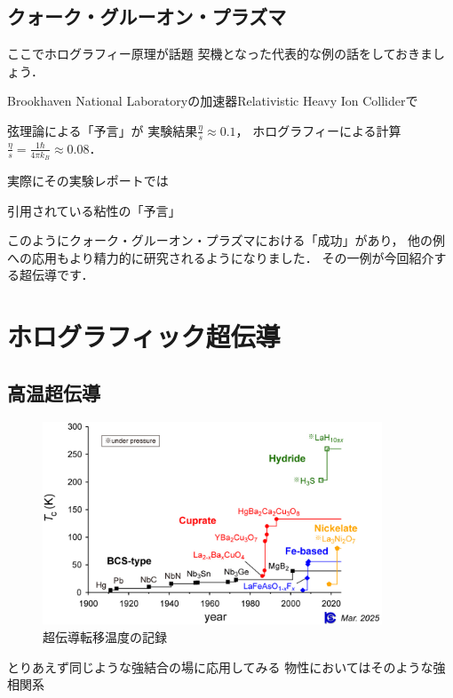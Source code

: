\documentclass[b5paper,11pt,dvipdfmx]{jsarticle}
\numberwithin{equation}{section}
\theoremstyle{definition}
\begin{document}
\subsection{クォーク・グルーオン・プラズマ}
ここでホログラフィー原理が話題
契機となった代表的な例の話をしておきましょう．

Brookhaven National Laboratoryの加速器Relativistic Heavy Ion Colliderで


弦理論による「予言」が
実験結果$\frac{\eta}{s} \approx 0.1$，
ホログラフィーによる計算$\frac{\eta}{s} = \frac{1 \hbar}{4 \pi k_B} \approx 0.08$．

実際にその実験レポート\cite{PHENIX06}では




引用されている粘性の「予言」\cite{Kovtun04}

このようにクォーク・グルーオン・プラズマにおける「成功」があり，
他の例への応用もより精力的に研究されるようになりました．
その一例が今回紹介する超伝導です．


\section{ホログラフィック超伝導}

\subsection{高温超伝導}
\begin{figure}[t]
    \centering
    \includegraphics[width=0.9\textwidth]{tc-history_2025.jpg}
    \caption{超伝導転移温度の記録}
    \label{fig:tc-history}
\end{figure}


とりあえず同じような強結合の場に応用してみる
物性においてはそのような強相関系
\end{document}
